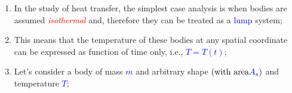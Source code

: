 \documentclass[10pt,compress,unknownkeysallowed]{beamer}
\newcommand{\red}{\textcolor{red}}
\newcommand{\blue}{\textcolor{blue}}
\begin{document}
\begin{frame}
%
        \begin{enumerate}
           \item<1-> In the study of heat transfer, the simplest case analysis is when bodies are assumed \red{{\it isothermal}} and, therefore they can be treated as a \blue{lump} system;
           \item<2-> This means that the temperature of these bodies at any spatial coordinate can be expressed as function of time only, i.e., \blue{$T=T\left(t\right)$}; 
           \item<4-> Let's consider a body of mass \blue{$m$} and arbitrary shape $\left(\text{with area} \blue{A_{s}}\right)$ and temperature \blue{$T$};
        \end{enumerate}
\end{frame}

\end{document}
